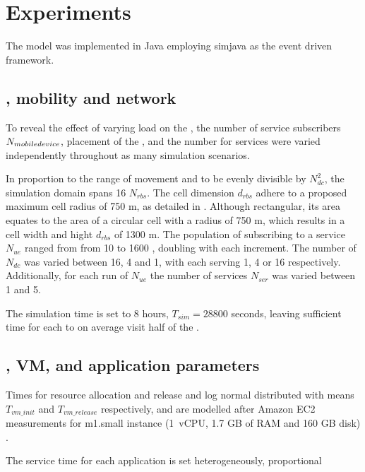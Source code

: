 \section{Experiments}
\label{sec:experiments}
The \xcloud model was implemented in Java employing simjava \cite{SimJava} as the event driven framework.

\subsection{\Ue, mobility and network}
To reveal the effect of varying load on the \dcs{}, the number of \ue{} service subscribers $N_{mobile device}$, placement of the \dcs{}, and the number for services were varied independently throughout as many simulation scenarios.

In proportion to the range of movement and to be evenly divisible by $N_{dc}^2$, the simulation domain spans 16 \rbss{} $N_{rbs}$. The cell dimension $d_{rbs}$ adhere to a proposed maximum cell radius of 750 m, as detailed in \cite{shahab2013framework}. Although rectangular, its area equates to the area of a circular cell with a radius of 750 m, which results in a cell width and hight $d_{rbs}$ of 1300 m. The population of \ues{} subscribing to a service $N_{ue}$ ranged from from 10 to 1600 \ues{}, doubling with each increment. The number of \dcs{} $N_{dc}$ was varied between 16, 4 and 1, with each \dc{} serving 1, 4 or 16 \rbss{} respectively. Additionally, for each run of $N_{ue}$ the number of services $N_{ser}$ was varied between 1 and 5.

The simulation time is set to 8 hours, $T_{sim}=28800$ seconds, leaving sufficient time for each \ue{} to on average visit half of the \rbss{}.

\subsection{\Dc{}, VM, and application parameters}
Times for resource allocation and release and log normal distributed with means $T_{vm\_init}$ and $T_{vm\_release}$ respectively, and are modelled after Amazon EC2 measurements for m1.small instance (1~vCPU, 1.7 GB of RAM and 160 GB disk) \cite{5719609}. %

The service time for each application is set heterogeneously, proportional %

